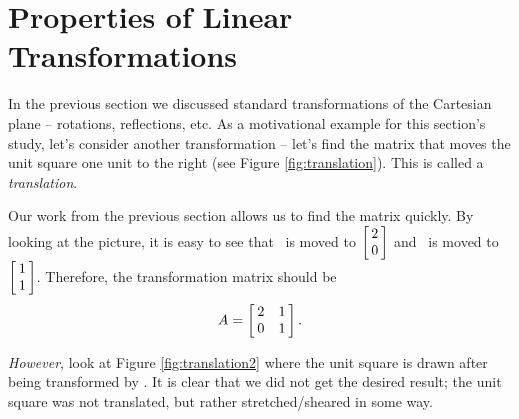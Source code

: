 
\section{Properties of Linear Transformations}\label{sec:lin_trans}



In the previous section we discussed standard transformations of the Cartesian plane -- rotations, reflections, etc. As a motivational example for this section's study, let's consider another transformation -- let's find the matrix that moves the unit square one unit to the right (see Figure \ref{fig:translation}). This is called a \textit{translation}.

\begin{myfigure}
\begin{center}
\label{fig:translation}
\end{center}
\end{myfigure}

Our work from the previous section allows us to find the matrix quickly. By looking at the picture, it is easy to see that \veone\ is moved to $\bmx{c} 2\\0\emx$ and \vetwo\ is moved to $\bmx{c}1\\1\emx$. Therefore, the transformation matrix should be $$\tta = \bmx{cc} 2&1\\0&1\emx.$$

\textit{However}, look at Figure \ref{fig:translation2} where the unit square is drawn after being transformed by \tta. It is clear that we did not get the desired result; the unit square was not translated, but rather stretched/sheared in some way.

\begin{myfigure}
\begin{center}
\label{fig:translation2}
\end{center}
\end{myfigure}

